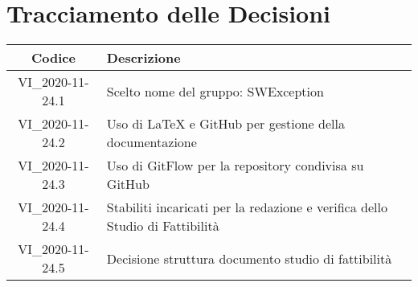 \section*{Tracciamento delle Decisioni}

\begin{center}
	\begin{longtable}{|c|p{14.5cm}|}
	\hline
	\rowcolor{lighter-grayer}
	\textbf{Codice} & \textbf{Descrizione} \\
	\hline
	\endfirsthead

	\hline
	VI\_2020-11-24.1 & Scelto nome del gruppo: SWException \\
	VI\_2020-11-24.2 & Uso di LaTeX e GitHub per gestione della documentazione \\
	VI\_2020-11-24.3 & Uso di GitFlow per la repository condivisa su GitHub\\
	VI\_2020-11-24.4 & Stabiliti incaricati per la redazione e verifica dello Studio di Fattibilità\\
	VI\_2020-11-24.5 & Decisione struttura documento studio di fattibilità \\
	\hline

	\end{longtable}
\end{center}
